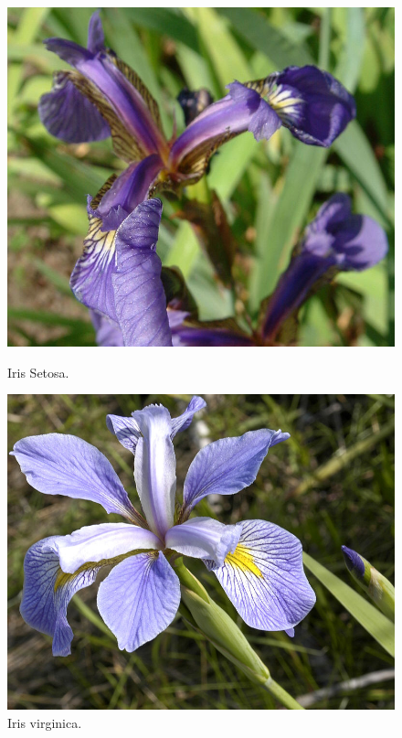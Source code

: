 \documentclass[a4paper, 20pt]{article}
\begin{document}
\begin{figure}[h]
  \centering
  \begin{minipage}[h]{0.29\textwidth}
    \includegraphics[width=\textwidth]{dani/setosa.jpg}
    \caption{Iris Setosa.}
  \end{minipage}
  \hfill
  \begin{minipage}[h]{0.3\textwidth}
    \includegraphics[width=\textwidth]{dani/virginica.jpg}
    \caption{Iris virginica.}
  \end{minipage}
  \hfill

\end{figure}
\end{document}
